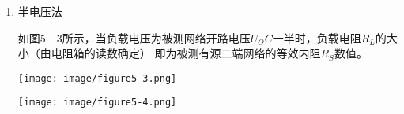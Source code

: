 \documentclass[UTF8]{article}
\begin{document}
\begin{enumerate}[label=\textbf{\arabic*}.]
\begin{enumerate}[label=(\textbf{\arabic*})]
\begin{adjustwidth}{0em}{0em}
\begin{minipage}[H]{0.5\textwidth}
                            \raggedright
                            \noindent\hspace{2em}一种方法是用电压表、电流表测出有源二端网络的
                            外特性曲线，如图5－2所示。开路电压为$U_OC$，根据外
                            特性曲线求出斜率$tg(\phi)$，则内阻为：
                            \begin{equation*}
                                R_S = tg(\phi) = \frac{\Delta U}{\Delta I}
                            \end{equation*}
                            \noindent\hspace{2em}另一种方法是测量有源二端网络的开路电压 $U_OC$，
                            以及额定电流$I_N$和对应的输出端额定电压$U_N$，如图 5-1所示，则内阻为：
                            \begin{equation*}
                                R_S = \frac{U_{OC} - U_N}{I_N}
                            \end{equation*}
                        \end{minipage}
                        \begin{minipage}[H]{0.4\textwidth}
                            \centering
                            \texttt{[image: image/figure5-2.png]}
                        \end{minipage}
                    \end{adjustwidth}
                    \item 半电压法
                    \par
                    \noindent\hspace{2em}如图5－3所示，当负载电压为被测网络开路电压$U_OC$一半时，负载电阻$R_L$的大小（由电阻箱的读数确定）
                    即为被测有源二端网络的等效内阻$R_S$数值。 
                    \begin{adjustwidth}{0em}{0em}
                        \centering
                        \begin{minipage}[H]{0.4\textwidth}
                            \centering
                            \texttt{[image: image/figure5-3.png]}
                        \end{minipage}
                        \hfill
                        \begin{minipage}[H]{0.4\textwidth}
                            \centering
                            \texttt{[image: image/figure5-4.png]}

\end{minipage}
\end{adjustwidth}
\end{enumerate}
\end{enumerate}
\end{document}
